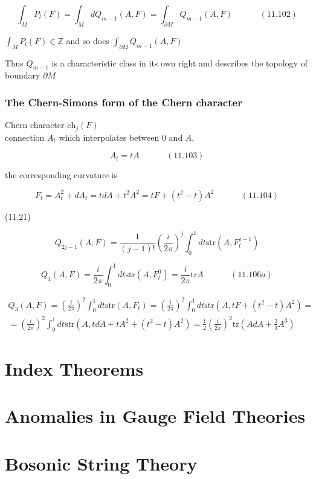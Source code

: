 \documentclass[twoside]{amsart}
\begin{document}
\begin{equation}
  \int_M P_l(F) = \int_M dQ_{m-1}{ (A, F)} = \int_{\partial M} Q_{m-1}{ (A, F) } \quad \quad \quad \, (11.102)
\end{equation}

$\int_M P_l(F) \in \mathbb{Z}$ and so does $\int_{ \partial M } Q_{m-1}{ (A, F) }$

Thus $Q_{m-1}$ is a characteristic class in its own right and describes the topology of boundary $\partial M$





\subsubsection{ The Chern-Simons form of the Chern character}

Chern character $\text{ch}_j{(F)}$ \\
\quad connection $A_t$ which interpolates between $0$ and $A$, 

\begin{equation}
  A_t = tA \quad \quad \quad \, (11.103)
\end{equation}

the corresponding curvature is 

\begin{equation}
  F_t = A_t^2 + dA_t = t dA + t^2 A^2 = tF + (t^2- t)A^2 \quad \quad \quad \, (11.104)
\end{equation}

(11.21)

\begin{equation}
  Q_{2j-1}(A, F) = \frac{1}{ (j-1)!} \left( \frac{i}{ 2\pi } \right)^j \int_0^1 dt \text{str}{ (A, F^{j-1}_t )}
\end{equation}

\begin{equation}
  Q_1(A,F) = \frac{i}{2\pi} \int_0^1 dt \text{str}{ (A, F_t^0) } = \frac{i}{2\pi} \text{tr}{A} \quad \quad \quad \, (11.106a)
\end{equation}

\begin{equation}
  \begin{gathered} 
    Q_3(A,F) = \left( \frac{i}{2\pi} \right)^2 \int_0^1 dt \text{str}{ (A, F_t) } = \left( \frac{i}{2\pi} \right)^2 \int_0^1 dt \text{str}{ (A, tF + (t^2 - t) A^2) } = \\
    = \left( \frac{i}{2\pi} \right)^2 \int_0^1 dt \text{str}{ (A, t dA + tA^2 + (t^2 - t) A^2 )}    = \frac{1}{2} \left( \frac{i}{2\pi  } \right)^2 \text{tr}{ ( A dA + \frac{2}{3} A^3 ) }
\end{gathered}
\end{equation}






\section{Index Theorems}




\section{Anomalies in Gauge Field Theories}




\section{Bosonic String Theory}
\end{document}
